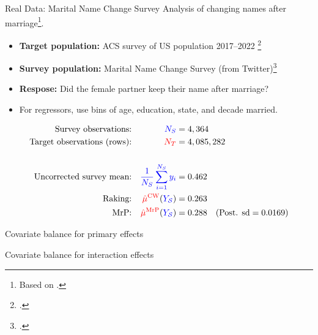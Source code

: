 

\begin{frame}{Real Data: Marital Name Change Survey}
Analysis of changing names after marriage\footnote{
    Based on \textcite{alexander:2019:namechange}.}.

\begin{itemize}
    \item \textbf{Target population:} ACS survey of US population 2017--2022 \footcite{ipumsusa}
    \item \textbf{Survey population:} Marital Name Change Survey (from Twitter)\footcite{cohen:2019:namechange}
    \item \textbf{Respose:}  Did the female partner keep their name after marriage?
    \item For regressors, use bins of age, education, state, and decade married.
\end{itemize}

$$
\begin{aligned}
    \textrm{Survey observations:} &&  \textcolor{blue}{{N_S}} ={}& 4,364  \\
    \textrm{Target observations (rows):} &&  \textcolor{red}{{N_T}} ={}& 4,085,282 \\
    \\
    \textrm{Uncorrected survey mean:} && \textcolor{blue}{\frac{1}{{N_S}} \sum_{i=1}^{N_S} y_i} ={}& 0.462 \\
    \textrm{Raking:} && \textcolor{red}{\hat{\mu}^{\mathrm{CW}}}(\textcolor{blue}{\textcolor{blue}{Y_{\mathcal{S}}}}) ={}& 0.263 \\
    \textrm{MrP:} && \textcolor{red}{\hat{\mu}^{\mathrm{MrP}}}(\textcolor{blue}{\textcolor{blue}{Y_{\mathcal{S}}}}) ={}& 0.288
        \quad(\textrm{Post. sd} = 0.0169)\\
\end{aligned}
$$
%
\end{frame}




\begin{frame}{Covariate balance for primary effects}
\AlexanderImbalancePrimary{}
\end{frame}


\begin{frame}{Covariate balance for interaction effects}
\AlexanderImbalanceInteraction{}
\end{frame}




